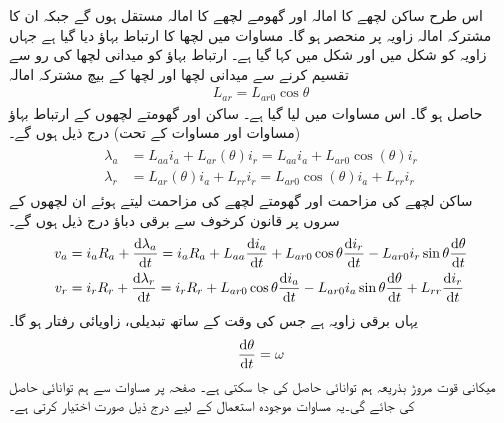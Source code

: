 اس طرح ساکن لچھے کا امالہ  اور گھومے لچھے کا امالہ  مستقل ہوں گے جبکہ ان کا مشترکہ امالہ  زاویہ  پر منحصر ہو گا۔ مساوات  میں لچھا  کا  ارتباط بہاؤ  دیا گیا ہے  جہاں  زاویہ  کو شکل  میں  اور شکل   میں  کہا گیا ہے۔ ارتباط بہاؤ   کو میدانی لچھا کی  رو  سے تقسیم کرنے سے میدانی لچھا اور لچھا  کے بیچ مشترکہ امالہ 
\begin{align}
L_{ar}=L_{ar0} \cos \theta
\end{align}
حاصل ہو گا۔ اس مساوات میں  لیا گیا ہے۔
ساکن اور گھومتے لچھوں کے ارتباط بہاؤ  (مساوات  اور مساوات
  کے تحت) درج ذیل ہوں گے۔
\begin{gather}
\begin{aligned}
\lambda_a&=L_{aa} i_a+L_{ar}(\theta) i_r=L_{aa} i_a+L_{ar0} \cos (\theta) i_r\\
\lambda_r&=L_{ar}(\theta) i_a+L_{rr} i_r=L_{ar0} \cos (\theta) i_a+L_{rr} i_r
\end{aligned}
\end{gather}
ساکن لچھے کی مزاحمت  اور گھومتے لچھے کی مزاحمت  لیتے ہوئے ان لچھوں کے سروں پر  قانون کرخوف سے برقی دباؤ درج ذیل ہوں گے۔
\begin{gather}
\begin{aligned}
v_a&=i_a R_a +\frac{\dif \lambda_a}{\dif t}=i_a R_a+L_{aa} \frac{\dif i_a}{\dif t}+L_{ar0} \cos \theta \frac{\dif i_r}{\dif t}-L_{ar0}  i_r \sin \theta  \frac{\dif \theta}{\dif t}\\
v_r&=i_r R_r +\frac{\dif \lambda_r}{\dif t}=i_r R_r+L_{ar0} \cos \theta \frac{\dif i_a}{\dif t}-L_{ar0} i_a \sin \theta  \frac{\dif \theta}{\dif t}+L_{rr} \frac{\dif i_r}{\dif t}
\end{aligned}
\end{gather}
یہاں  برقی زاویہ ہے جس کی وقت کے ساتھ  تبدیلی، زاویائی رفتار   ہو گا۔
\begin{align}
\frac{\dif \theta}{\dif t}=\omega
\end{align}
میکانی قوت مروڑ بذریعہ ہم توانائی حاصل کی جا سکتی ہے۔ صفحہ  پر مساوات   سے  ہم توانائی  حاصل  کی جائے  گی۔یہ مساوات موجودہ استعمال کے لیے درج ذیل صورت اختیار کرتی ہے۔
